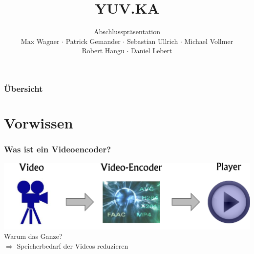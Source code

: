 \documentclass[t]{beamer}
\title{YUV.KA}
\subtitle{Abschlusspräsentation \\[0.3cm]
Max Wagner $\cdot$ Patrick Gemander $\cdot$ Sebastian Ullrich $\cdot$ Michael Vollmer \\ Robert Hangu $\cdot$ Daniel Lebert}
\institute[ITEC]{Institut für Technische Informatik}
\begin{document}
\begin{frame}
	\maketitle
\end{frame}

\begin{frame}
	\frametitle{Übersicht}
	\tableofcontents
\end{frame}

\section{Vorwissen}
\begin{frame}
	\frametitle{Was ist ein Videoencoder?}
	\begin{center}
		\vspace*{\fill}
		\includegraphics[scale=.43]{video-encoding-process.png}
		\vspace*{\fill}
		\onslide<2-> Warum das Ganze? ~\\
		\onslide<3-> $ \Longrightarrow $ Speicherbedarf der Videos reduzieren
	\end{center}
\end{frame}
\end{document}
